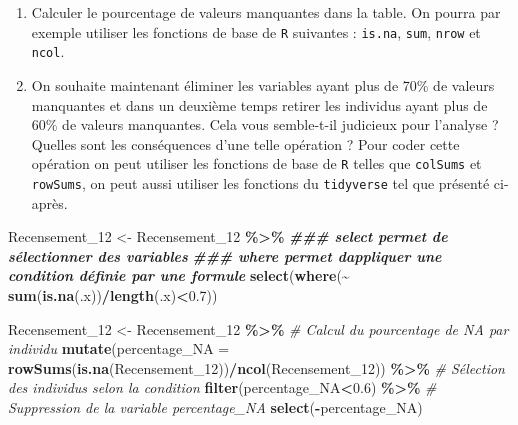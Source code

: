 \documentclass[
]{article}
\newenvironment{Shaded}{\begin{snugshade}}{\end{snugshade}}
\newcommand{\AttributeTok}[1]{\textcolor[rgb]{0.13,0.29,0.53}{#1}}
\newcommand{\CommentTok}[1]{\textcolor[rgb]{0.56,0.35,0.01}{\textit{#1}}}
\newcommand{\DocumentationTok}[1]{\textcolor[rgb]{0.56,0.35,0.01}{\textbf{\textit{#1}}}}
\newcommand{\FloatTok}[1]{\textcolor[rgb]{0.00,0.00,0.81}{#1}}
\newcommand{\FunctionTok}[1]{\textcolor[rgb]{0.13,0.29,0.53}{\textbf{#1}}}
\newcommand{\NormalTok}[1]{#1}
\newcommand{\OtherTok}[1]{\textcolor[rgb]{0.56,0.35,0.01}{#1}}
\newcommand{\SpecialCharTok}[1]{\textcolor[rgb]{0.81,0.36,0.00}{\textbf{#1}}}
\begin{document}
\begin{enumerate}
\def\labelenumi{\arabic{enumi}.}
\setcounter{enumi}{5}
\item
  Calculer le pourcentage de valeurs manquantes dans la table. On pourra
  par exemple utiliser les fonctions de base de \texttt{R} suivantes :
  \texttt{is.na}, \texttt{sum}, \texttt{nrow} et \texttt{ncol}.
\item
  On souhaite maintenant éliminer les variables ayant plus de 70\% de
  valeurs manquantes et dans un deuxième temps retirer les individus
  ayant plus de 60\% de valeurs manquantes. Cela vous semble-t-il
  judicieux pour l'analyse ? Quelles sont les conséquences d'une telle
  opération ? Pour coder cette opération on peut utiliser les fonctions
  de base de \texttt{R} telles que \texttt{colSums} et \texttt{rowSums},
  on peut aussi utiliser les fonctions du \texttt{tidyverse} tel que
  présenté ci-après.
\end{enumerate}

\begin{Shaded}
\begin{Highlighting}[]
\NormalTok{Recensement\_12 }\OtherTok{\textless{}{-}}\NormalTok{ Recensement\_12 }\SpecialCharTok{\%\textgreater{}\%} 
  \DocumentationTok{\#\#\# select permet de sélectionner des variables}
  \DocumentationTok{\#\#\# where permet d\textquotesingle{}appliquer une condition définie par une formule}
  \FunctionTok{select}\NormalTok{(}\FunctionTok{where}\NormalTok{(}\SpecialCharTok{\textasciitilde{}} \FunctionTok{sum}\NormalTok{(}\FunctionTok{is.na}\NormalTok{(.x))}\SpecialCharTok{/}\FunctionTok{length}\NormalTok{(.x)}\SpecialCharTok{\textless{}}\FloatTok{0.7}\NormalTok{))}

\NormalTok{Recensement\_12 }\OtherTok{\textless{}{-}}\NormalTok{ Recensement\_12 }\SpecialCharTok{\%\textgreater{}\%} 
  \CommentTok{\# Calcul du pourcentage de NA par individu}
  \FunctionTok{mutate}\NormalTok{(}\AttributeTok{percentage\_NA =} \FunctionTok{rowSums}\NormalTok{(}\FunctionTok{is.na}\NormalTok{(Recensement\_12))}\SpecialCharTok{/}\FunctionTok{ncol}\NormalTok{(Recensement\_12)) }\SpecialCharTok{\%\textgreater{}\%}
  \CommentTok{\# Sélection des individus selon la condition}
  \FunctionTok{filter}\NormalTok{(percentage\_NA}\SpecialCharTok{\textless{}}\FloatTok{0.6}\NormalTok{) }\SpecialCharTok{\%\textgreater{}\%}
  \CommentTok{\# Suppression de la variable percentage\_NA}
  \FunctionTok{select}\NormalTok{(}\SpecialCharTok{{-}}\NormalTok{percentage\_NA)}
\end{Highlighting}
\end{Shaded}
\end{document}
